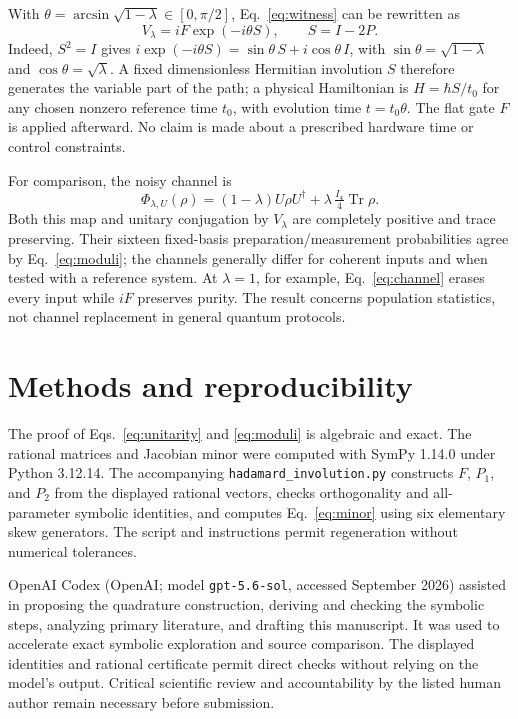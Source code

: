 \documentclass[aip,jmp,preprint]{revtex4-2}
\begin{document}
With $\theta=\arcsin\sqrt{1-\lambda}\in[0,\pi/2]$, Eq.~\eqref{eq:witness} can be rewritten as
\begin{equation}
 V_\lambda=iF\exp(-i\theta S),\qquad S=I-2P .
 \label{eq:gate}
\end{equation}
Indeed, $S^2=I$ gives $i\exp(-i\theta S)=\sin\theta\,S+i\cos\theta\,I$, with $\sin\theta=\sqrt{1-\lambda}$ and $\cos\theta=\sqrt\lambda$. A fixed dimensionless Hermitian involution $S$ therefore generates the variable part of the path; a physical Hamiltonian is $H=\hbar S/t_0$ for any chosen nonzero reference time $t_0$, with evolution time $t=t_0\theta$. The flat gate $F$ is applied afterward. No claim is made about a prescribed hardware time or control constraints.

For comparison, the noisy channel is
\begin{equation}
 \Phi_{\lambda,U}(\rho)=(1-\lambda)U\rho U^\dagger
 +\lambda\,\tfrac{I_4}{4}\operatorname{Tr}\rho .
 \label{eq:channel}
\end{equation}
Both this map and unitary conjugation by $V_\lambda$ are completely positive and trace preserving. Their sixteen fixed-basis preparation/measurement probabilities agree by Eq.~\eqref{eq:moduli}; the channels generally differ for coherent inputs and when tested with a reference system. At $\lambda=1$, for example, Eq.~\eqref{eq:channel} erases every input while $iF$ preserves purity. The result concerns population statistics, not channel replacement in general quantum protocols.

\section{Methods and reproducibility}

The proof of Eqs.~\eqref{eq:unitarity} and \eqref{eq:moduli} is algebraic and exact. The rational matrices and Jacobian minor were computed with SymPy 1.14.0 under Python 3.12.14. The accompanying \texttt{hadamard\_involution.py} constructs $F$, $P_1$, and $P_2$ from the displayed rational vectors, checks orthogonality and all-parameter symbolic identities, and computes Eq.~\eqref{eq:minor} using six elementary skew generators. The script and instructions permit regeneration without numerical tolerances.

OpenAI Codex (OpenAI; model \texttt{gpt-5.6-sol}, accessed September 2026) assisted in proposing the quadrature construction, deriving and checking the symbolic steps, analyzing primary literature, and drafting this manuscript. It was used to accelerate exact symbolic exploration and source comparison. The displayed identities and rational certificate permit direct checks without relying on the model's output. Critical scientific review and accountability by the listed human author remain necessary before submission.
\end{document}
